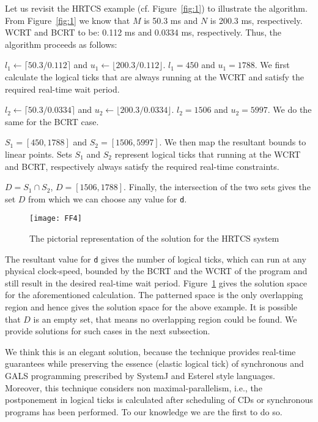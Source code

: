 Let us revisit the HRTCS example (cf. Figure~\ref{fig:1}) to illustrate
the algorithm. From Figure~\ref{fig:1} we know that $M$ is 50.3 ms and
$N$ is 200.3 ms, respectively.  WCRT and BCRT to be: 0.112 ms and 0.0334 ms,
respectively. Thus, the algorithm proceeds as follows:

\begin{enumerate*}
\item $l_1 \leftarrow \lceil 50.3/0.112 \rceil$ and $u_1 \leftarrow
  \lfloor 200.3/0.112 \rfloor$. $l_1 = 450$ and $u_1 = 1788$. We first
  calculate the logical ticks that are always running at the WCRT and
  satisfy the required real-time wait period.
\item $l_2 \leftarrow \lceil 50.3/0.0334 \rceil$ and $u_2 \leftarrow
  \lfloor 200.3/0.0334 \rfloor$. $l_2 = 1506$ and $u_2 = 5997$. We do
  the same for the BCRT case.
\item $S_1 = [450,1788]$ and $S_2 =[1506,5997]$. We then map the
  resultant bounds to linear points. Sets $S_1$ and $S_2$ represent
  logical ticks that running at the WCRT and BCRT, respectively always
  satisfy the required real-time constraints.
\item $D = S_1 \cap S_2$, $D = [1506,1788]$. Finally, the intersection
  of the two sets gives the set $D$ from which we can choose any value
  for \texttt{d}.
\end{enumerate*}

\begin{figure}[t!]
  \centering
  \texttt{[image: FF4]}
  \caption{The pictorial representation of the solution for the HRTCS system}
  \label{fig:hrtcssoln}
\end{figure}

The resultant value for \texttt{d} gives the number of logical ticks,
which can run at any physical clock-speed, bounded by the BCRT and the
WCRT of the program and still result in the desired real-time wait
period. Figure~\ref{fig:hrtcssoln} gives the solution space for the
aforementioned calculation. The patterned space is the only overlapping
region and hence gives the solution space for the above example. It is
possible that $D$ is an empty set, that means no overlapping region
could be found. We provide solutions for such cases in the next
subsection.

We think this is an elegant solution, because the technique provides
real-time guarantees while preserving the essence (elastic logical tick)
of synchronous and GALS programming prescribed by SystemJ and Esterel
style languages. Moreover, this technique considers non
maximal-parallelism, i.e., the postponement in logical ticks is
calculated after scheduling of CDs or synchronous programs has been
performed. To our knowledge we are the first to do so.

